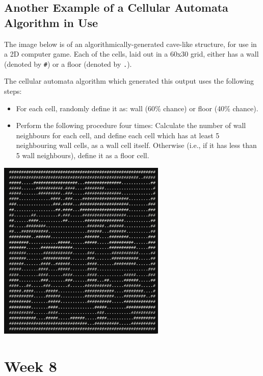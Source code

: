 \documentclass[11pt]{article}
\begin{document}
\subsection{Another Example of a Cellular Automata Algorithm in Use}
The image below is of an algorithmically-generated cave-like structure, for use in a 2D computer game.
Each of the cells, laid out in a 60x30 grid, either has a wall (denoted by \verb|#|) or a floor (denoted by \verb|.|).

The cellular automata algorithm which generated this output uses the following steps:
\begin{itemize}
    \item   For each cell, randomly define it as: wall (60\% chance) or floor (40\% chance). 
    \item   Perform the following procedure four times: Calculate the number of wall neighbours for each cell, and 
            define each cell which has at least 5 neighbouring wall cells, as a wall cell itself.
            Otherwise (i.e., if it has less than 5 wall neighbours), define it as a floor cell.
\end{itemize}

\begin{center}
    \includegraphics[width=0.6\textwidth]{cave.png}
\end{center}

\section{Week 8}
\end{document}

